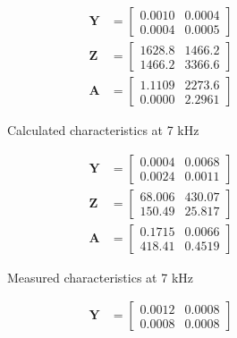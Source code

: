 \documentclass[notitlepage, a4paper, 11pt]{article}
\begin{document}
		\begin{figure}[H]
		\begin{subfigure}{0.45\textwidth}
			\begin{align*}
				\mathbf{Y} &= 
				\begin{bmatrix}
					0.0010  &  0.0004 \\
					0.0004  &  0.0005
				\end{bmatrix}
				\\
				\mathbf{Z} &= 
				\begin{bmatrix}
				    1628.8  &  1466.2 \\
					1466.2  &  3366.6
				\end{bmatrix}
				\\
				\mathbf{A} &= 
				\begin{bmatrix}
				    1.1109  &  2273.6 \\
					0.0000  &  2.2961
				\end{bmatrix}
			\end{align*}
			\caption{Calculated characteristics at 7 kHz}
		\end{subfigure}
		\hfill
		\begin{subfigure}{0.45\textwidth}
			\begin{align*}
				\mathbf{Y} &= 
				\begin{bmatrix}
	    			0.0004  &  0.0068 \\
					0.0024  &  0.0011
				\end{bmatrix}
				\\
				\mathbf{Z} &= 		
				\begin{bmatrix}
				   68.006 & 430.07 \\
					150.49  & 25.817
				\end{bmatrix}
				\\
				\mathbf{A} &= 
				\begin{bmatrix}
					    0.1715  &  0.0066 \\
					418.41   & 0.4519
				\end{bmatrix}
			\end{align*}
			\caption{Measured characteristics at 7 kHz}
		\end{subfigure}
		\hfill
		\begin{subfigure}{0.45\textwidth}
			\begin{align*}
				\mathbf{Y} &= 
				\begin{bmatrix}
					    0.0012 &   0.0008 \\
					0.0008  &  0.0008
				\end{bmatrix}
				\\

\end{align*}
\end{subfigure}
\end{figure}
\end{document}
